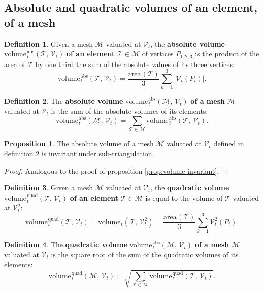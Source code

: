 \documentclass{article}
\theoremstyle{definition}
\newtheorem{defn}{Definition}
\newtheorem{prop}{Proposition}
\newcommand{\MM}{\mathcal{M}}
\newcommand{\VV}{\mathcal{V}}
\newcommand{\TT}{\mathcal{T}}
\newcommand{\area}{\mathrm{area}\hspace{1pt}}
\newcommand{\vol}{\mathrm{volume\hspace{1pt}}}
\newcommand{\absvol}{\mathrm{volume\hspace{1pt}}^\mathrm{abs}}
\newcommand{\quadvol}{\mathrm{volume\hspace{1pt}}^\mathrm{quad}}
\begin{document}
\subsection{Absolute and quadratic volumes of an element, of a mesh}
\begin{defn}
Given a mesh $\MM$ valuated at $\VV_t$, the \textbf{absolute volume} $\absvol_t(\TT,\,\VV_t)$ \textbf{of an element} $\TT\in\MM$ of vertices $P_{1,2,3}$ is the product of the area of $\TT$ by one third the sum of the absolute values of its three vertices:
\[\absvol_t(\TT,\,\VV_t) = \frac{\area(\TT)}{3}
\sum_{k=1}^3 \left| \VV_t(P_i) \right|. \]
\label{def:absVolumeT}\end{defn}

\begin{defn}
The \textbf{absolute volume} $\absvol_t(\MM,\,\VV_t)$ \textbf{of a mesh} $\MM$ valuated at $\VV_t$ is the sum of the absolute volumes of its elements:
\[\absvol_t(\MM,\,\VV_t) = \sum_{\TT\in\MM}\absvol_t(\TT,\,\VV_t).\]
\label{def:absVolumeM}\end{defn}

\begin{prop}
The absolute volume of a mesh $\MM$ valuated at $\VV_t$ defined in definition \ref{def:absVolumeM} is invariant under sub-triangulation.\label{prop:absvolume-invariant}
\end{prop}
\begin{proof}[Proof]
Analogous to the proof of proposition \ref{prop:volume-invariant}.
\end{proof}


\begin{defn}
Given a mesh $\MM$ valuated at $\VV_t$, the \textbf{quadratic volume} $\quadvol_t(\TT,\,\VV_t)$ \textbf{of an element} $\TT\in\MM$ is equal to the volume of $\TT$ valuated at $\VV_t^2$:
\[\quadvol_t(\TT,\,\VV_t) =\vol_t(\TT,\,\VV_t^2) =  \frac{\area(\TT)}{3}
\sum_{k=1}^3  \VV_t^2(P_i). \]
\label{def:quadVolumeT}\end{defn}

\begin{defn}
The \textbf{quadratic volume} $\absvol_t(\MM,\,\VV_t)$ \textbf{of a mesh} $\MM$ valuated at $\VV_t$ is the square root of the sum of the quadratic volumes of its elements:
\[\quadvol_t(\MM,\,\VV_t) = \sqrt{\sum_{\TT\in\MM}\quadvol_t(\TT,\,\VV_t)}.\]
\label{def:quadVolumeM}\end{defn}
\end{document}
